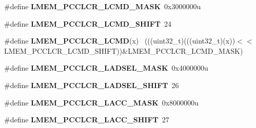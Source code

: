 \begin{DoxyCompactItemize}
\item 
\hypertarget{group___l_m_e_m___register___masks_gaf99b6031ae94b6582cd03197e72f379d}{}\#define {\bfseries L\+M\+E\+M\+\_\+\+P\+C\+C\+L\+C\+R\+\_\+\+L\+C\+M\+D\+\_\+\+M\+A\+S\+K}~0x3000000u\label{group___l_m_e_m___register___masks_gaf99b6031ae94b6582cd03197e72f379d}

\item 
\hypertarget{group___l_m_e_m___register___masks_ga6dce7a04ca2c7e69285cac1a45ae98ce}{}\#define {\bfseries L\+M\+E\+M\+\_\+\+P\+C\+C\+L\+C\+R\+\_\+\+L\+C\+M\+D\+\_\+\+S\+H\+I\+F\+T}~24\label{group___l_m_e_m___register___masks_ga6dce7a04ca2c7e69285cac1a45ae98ce}

\item 
\hypertarget{group___l_m_e_m___register___masks_gaa83f8ff941f1da4c14f4640e2ef7d236}{}\#define {\bfseries L\+M\+E\+M\+\_\+\+P\+C\+C\+L\+C\+R\+\_\+\+L\+C\+M\+D}(x)                                        ~(((uint32\+\_\+t)(((uint32\+\_\+t)(x))$<$$<$L\+M\+E\+M\+\_\+\+P\+C\+C\+L\+C\+R\+\_\+\+L\+C\+M\+D\+\_\+\+S\+H\+I\+F\+T))\&L\+M\+E\+M\+\_\+\+P\+C\+C\+L\+C\+R\+\_\+\+L\+C\+M\+D\+\_\+\+M\+A\+S\+K)\label{group___l_m_e_m___register___masks_gaa83f8ff941f1da4c14f4640e2ef7d236}

\item 
\hypertarget{group___l_m_e_m___register___masks_gabfcd864c50e00017164c73e0c7546305}{}\#define {\bfseries L\+M\+E\+M\+\_\+\+P\+C\+C\+L\+C\+R\+\_\+\+L\+A\+D\+S\+E\+L\+\_\+\+M\+A\+S\+K}~0x4000000u\label{group___l_m_e_m___register___masks_gabfcd864c50e00017164c73e0c7546305}

\item 
\hypertarget{group___l_m_e_m___register___masks_ga2d0b5614086dafe7f8f336eea70a45ac}{}\#define {\bfseries L\+M\+E\+M\+\_\+\+P\+C\+C\+L\+C\+R\+\_\+\+L\+A\+D\+S\+E\+L\+\_\+\+S\+H\+I\+F\+T}~26\label{group___l_m_e_m___register___masks_ga2d0b5614086dafe7f8f336eea70a45ac}

\item 
\hypertarget{group___l_m_e_m___register___masks_ga674ad53312395a53144106a14350e5fd}{}\#define {\bfseries L\+M\+E\+M\+\_\+\+P\+C\+C\+L\+C\+R\+\_\+\+L\+A\+C\+C\+\_\+\+M\+A\+S\+K}~0x8000000u\label{group___l_m_e_m___register___masks_ga674ad53312395a53144106a14350e5fd}

\item 
\hypertarget{group___l_m_e_m___register___masks_ga5c874d8e0c72d65fabbaba28daa39daf}{}\#define {\bfseries L\+M\+E\+M\+\_\+\+P\+C\+C\+L\+C\+R\+\_\+\+L\+A\+C\+C\+\_\+\+S\+H\+I\+F\+T}~27\label{group___l_m_e_m___register___masks_ga5c874d8e0c72d65fabbaba28daa39daf}


\end{DoxyCompactItemize}
